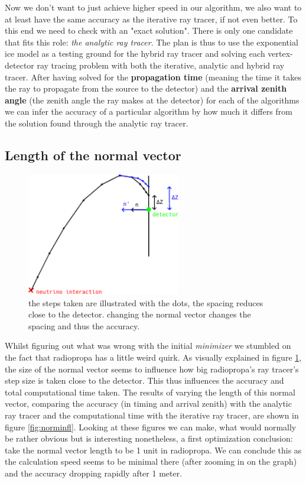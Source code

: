 Now we don't want to just achieve higher speed in our algorithm, we also want
to at least have the same accuracy as the iterative ray tracer, if not even better.
To this end we need to check with an "exact solution". There is only one candidate
that fits this role: \textit{the analytic ray tracer}. The plan is thus to use the
exponential ice model as a testing ground for the hybrid ray tracer and solving each
vertex-detector ray tracing problem with both the iterative, analytic and hybrid ray tracer.
After having solved for the \textbf{propagation time} (meaning the time it takes the ray to
propagate from the source to the detector) and the \textbf{arrival zenith angle} (the zenith angle
the ray makes at the detector) for each of the algorithms we can infer the accuracy of a particular
algorithm by how much it differs from the solution found through the analytic ray tracer.
\subsection{Length of the normal vector}
\begin{figure}
	\centering
	\includegraphics[width=0.6\textwidth]{figures/PrincipleNormIllu.pdf}
	\caption{the steps taken are illustrated with the dots, the spacing reduces close to the detector. changing
	the normal vector changes the spacing and thus the accuracy.}
	\label{fig:normexpl}
\end{figure}
Whilst figuring out what was wrong with the initial \textit{minimizer} we
stumbled on the fact that radiopropa has a little weird quirk.  As visually
explained in figure \ref{fig:normexpl}, the size of the normal vector seems to
influence how big radiopropa's ray tracer's step size is taken close to the
detector.  This thus influences the accuracy and total computational time
taken. The results of varying the length of this normal vector, comparing the
accuracy (in timing and arrival zenith) with the analytic ray tracer and the computational time with the
iterative ray tracer, are shown in figure \ref{fig:norminfl}.  
Looking at these figures we can make, what would
normally be rather obvious but is interesting nonetheless, a first optimization
conclusion: take the normal vector length to be 1 unit in radiopropa.
We can conclude this as the calculation speed seems to be minimal there (after zooming
in on the graph) and the accuracy dropping rapidly after 1 meter.

